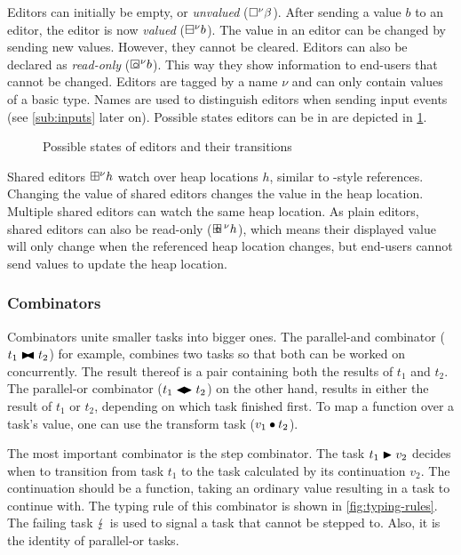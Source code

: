 Editors can initially be empty, or \emph{unvalued} ($\square^\nu \beta$).
After sending a value $b$ to an editor, the editor is now \emph{valued} ($\boxminus^\nu b$).
The value in an editor can be changed by sending new values.
However, they cannot be cleared.
Editors can also be declared as \emph{read-only} ($\square\mkern-14.33mu\circ\mkern-2mu^\nu b$).
This way they show information to end-users that cannot be changed.
Editors are tagged by a name $\nu$
and can only contain values of a basic type.
Names are used to distinguish editors when sending input events (see \cref{sub:inputs} later on).
Possible states editors can be in are depicted in \cref{fig:editor-state}.

\begin{figure}
  
  \caption{Possible states of editors and their transitions}
  \label{fig:editor-state}
\end{figure}

Shared editors $\boxplus^\nu h$ watch over heap locations $h$,
similar to \ML-style references.
Changing the value of shared editors changes the value in the heap location.
Multiple shared editors can watch the same heap location.
As plain editors, shared editors can also be read-only ($\boxplus\mkern-14.33mu\circ\mkern-0mu^\nu h$),
which means their displayed value will only change when the referenced heap location changes,
but end-users cannot send values to update the heap location.


\subsubsection{Combinators}

Combinators unite smaller tasks into bigger ones.
The parallel-and combinator ($t_1 \blacktriangleright\mkern-8mu\blacktriangleleft t_2$) for example,
combines two tasks so that both can be worked on concurrently.
The result thereof is a pair containing both the results of $t_1$ and $t_2$.
The parallel-or combinator ($t_1 \blacktriangleleft\mkern-4mu\blacktriangleright t_2$) on the other hand,
results in either the result of $t_1$ or $t_2$,
depending on which task finished first.
To map a function over a task's value,
one can use the transform task ($v_1 \bullet t_2$).

The most important combinator is the step combinator.
The task $t_1 \blacktriangleright v_2$ decides when to transition from task $t_1$
to the task calculated by its continuation $v_2$.
The continuation should be a function, taking an ordinary value resulting in a task to continue with.
The typing rule of this combinator is shown in \cref{fig:typing-rules}.
The failing task $\lightning$ is used to signal a task that cannot be stepped to.
Also, it is the identity of parallel-or tasks.

